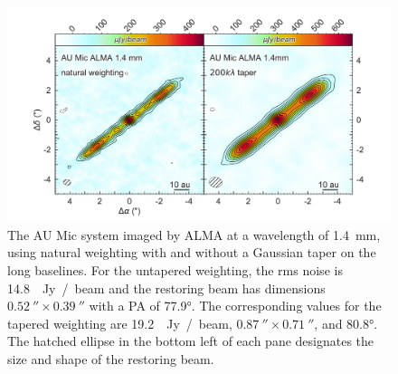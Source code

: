 \documentclass[12pt,oneside]{article}
\begin{document}
\begin{figure}
  \includegraphics[width=\linewidth]{figures/aumic_imaged}
  \caption{The AU Mic system imaged by ALMA at a wavelength of \SI{1.4}{mm}, using natural weighting with and without a Gaussian taper on the long baselines. 
  For the untapered weighting, the rms noise is \SI{14.8}{\mu Jy / beam} and the restoring beam has dimensions $\SI{0.52}{''} \times \SI{0.39}{''}$ with a PA of \ang{77.9}.
  The corresponding values for the tapered weighting are \SI{19.2}{\mu Jy / beam}, $\SI{0.87}{''} \times \SI{0.71}{''}$, and \ang{80.8}. 
  The hatched ellipse in the bottom left of each pane designates the size and shape of the restoring beam.
  }
  \label{fig: aumic_imaged}
\end{figure}
\end{document}
